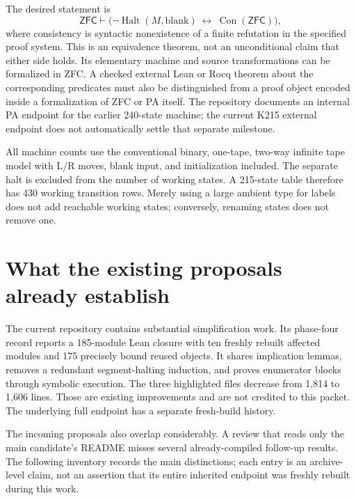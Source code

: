 \documentclass[11pt]{article}
\theoremstyle{definition}\newtheorem{definition}[theorem]{Definition}
\newcommand{\Con}{\operatorname{Con}}
\newcommand{\Halt}{\operatorname{Halt}}
\begin{document}
The desired statement is
\[
  \mathsf{ZFC}\vdash
  \bigl(\neg\Halt(M,\mathrm{blank})\ \longleftrightarrow\ \Con(\mathsf{ZFC})\bigr),
\]
where consistency is syntactic nonexistence of a finite refutation in the
specified proof system. This is an equivalence theorem, not an unconditional
claim that either side holds. Its elementary machine and source transformations
can be formalized in ZFC. A checked external Lean or Rocq theorem about the
corresponding predicates must also be distinguished from a proof object
encoded inside a formalization of ZFC or PA itself. The repository documents
an internal PA endpoint for the earlier 240-state machine; the current K215
external endpoint does not automatically settle that separate milestone.
\cite{verification}

All machine counts use the conventional binary, one-tape, two-way infinite
tape model with L/R moves, blank input, and initialization included. The
separate halt is excluded from the number of working states. A 215-state
table therefore has 430 working transition rows. Merely using a large ambient
type for labels does not add reachable working states; conversely, renaming
states does not remove one.

\section{What the existing proposals already establish}

The current repository contains substantial simplification work. Its phase-four
record reports a 185-module Lean closure with ten freshly rebuilt affected
modules and 175 precisely bound reused objects. It shares implication lemmas,
removes a redundant segment-halting induction, and proves enumerator blocks
through symbolic execution. The three highlighted files decrease from 1,814
to 1,606 lines. Those are existing improvements and are not credited to this
packet. The underlying full endpoint has a separate fresh-build history.
\cite{phase4}

The incoming proposals also overlap considerably. A review that reads only the
main candidate's README misses several already-compiled follow-up results.
The following inventory records the main distinctions; each entry is an
archive-level claim, not an assertion that its entire inherited endpoint was
freshly rebuilt during this work.
\end{document}
